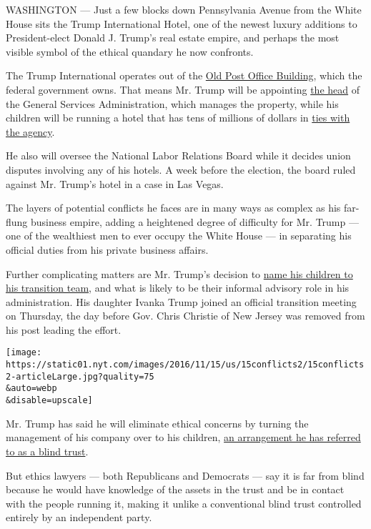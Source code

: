 WASHINGTON --- Just a few blocks down Pennsylvania Avenue from the White
House sits the Trump International Hotel, one of the newest luxury
additions to President-elect Donald J. Trump's real estate empire, and
perhaps the most visible symbol of the ethical quandary he now
confronts.

The Trump International operates out of the
\href{https://www.nps.gov/opot/index.htm}{Old Post Office Building},
which the federal government owns. That means Mr. Trump will be
appointing \href{http://www.gsa.gov/portal/content/101134}{the head} of
the General Services Administration, which manages the property, while
his children will be running a hotel that has tens of millions of
dollars in \href{http://www.gsa.gov/portal/content/305477}{ties with the
agency}.

He also will oversee the National Labor Relations Board while it decides
union disputes involving any of his hotels. A week before the election,
the board ruled against Mr. Trump's hotel in a case in Las Vegas.

The layers of potential conflicts he faces are in many ways as complex
as his far-flung business empire, adding a heightened degree of
difficulty for Mr. Trump --- one of the wealthiest men to ever occupy
the White House --- in separating his official duties from his private
business affairs.

Further complicating matters are Mr. Trump's decision to
\href{https://www.greatagain.gov/news/president-elect-donald-j-trump-announces-new-implementation-phase-presidential-transition-team.html}{name
his children to his transition team}, and what is likely to be their
informal advisory role in his administration. His daughter Ivanka Trump
joined an official transition meeting on Thursday, the day before Gov.
Chris Christie of New Jersey was removed from his post leading the
effort.

\texttt{[image: https://static01.nyt.com/images/2016/11/15/us/15conflicts2/15conflicts2-articleLarge.jpg?quality=75\\\&auto=webp\\\&disable=upscale]}

Mr. Trump has said he will eliminate ethical concerns by turning the
management of his company over to his children,
\href{http://www.nytimes.com/2016/01/15/us/politics/transcript-of-republican-presidential-debate.html}{an
arrangement he has referred to as a blind trust}.

But ethics lawyers --- both Republicans and Democrats --- say it is far
from blind because he would have knowledge of the assets in the trust
and be in contact with the people running it, making it unlike a
conventional blind trust controlled entirely by an independent party.

